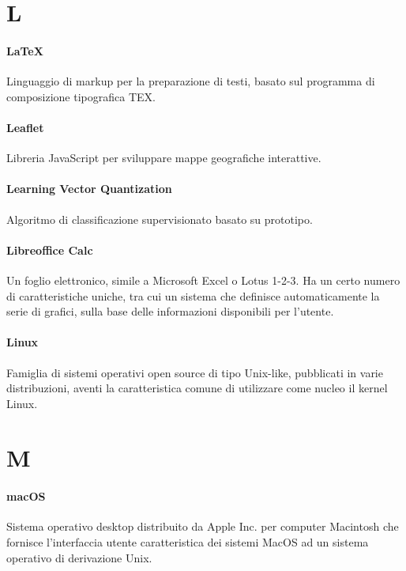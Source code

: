 \documentclass[]{article}
\begin{document}
	\newpage
	
	\section*{L}
	
	\paragraph*{LaTeX}
	Linguaggio di markup per la preparazione di testi, basato sul programma di composizione tipografica TEX.
	
	\paragraph*{Leaflet}
	Libreria JavaScript per sviluppare mappe geografiche interattive.
	
	\paragraph*{Learning Vector Quantization}
	Algoritmo di classificazione supervisionato basato su prototipo.
	
	\paragraph*{Libreoffice Calc}
	Un foglio elettronico, simile a Microsoft Excel o Lotus 1-2-3. Ha un certo numero di caratteristiche uniche, tra cui un sistema che definisce automaticamente la serie di grafici, sulla base delle informazioni disponibili per l'utente.
	
	\paragraph*{Linux}
	Famiglia di sistemi operativi open source di tipo Unix-like, pubblicati in varie distribuzioni, aventi la caratteristica comune di utilizzare come nucleo il kernel Linux.
	
	\newpage
	
	\section*{M}
	
	\paragraph*{macOS}
	Sistema operativo desktop distribuito da Apple Inc. per	computer Macintosh che fornisce l'interfaccia utente caratteristica dei sistemi	MacOS ad un sistema operativo di derivazione Unix.
	
\end{document}
